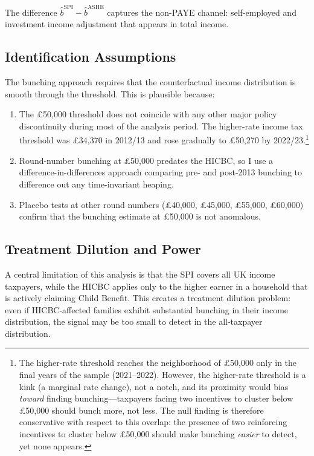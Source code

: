 \documentclass[12pt]{article}
\newcommand{\bhat}{\hat{b}}
\begin{document}
The difference $\bhat^{\text{SPI}} - \bhat^{\text{ASHE}}$ captures the non-PAYE channel: self-employed and investment income adjustment that appears in total income.

\subsection{Identification Assumptions}

The bunching approach requires that the counterfactual income distribution is smooth through the threshold. This is plausible because:

\begin{enumerate}
    \item The \pounds50,000 threshold does not coincide with any other major policy discontinuity during most of the analysis period. The higher-rate income tax threshold was \pounds34,370 in 2012/13 and rose gradually to \pounds50,270 by 2022/23.\footnote{The higher-rate threshold reaches the neighborhood of \pounds50,000 only in the final years of the sample (2021--2022). However, the higher-rate threshold is a kink (a marginal rate change), not a notch, and its proximity would bias \emph{toward} finding bunching---taxpayers facing two incentives to cluster below \pounds50,000 should bunch more, not less. The null finding is therefore conservative with respect to this overlap: the presence of two reinforcing incentives to cluster below \pounds50,000 should make bunching \emph{easier} to detect, yet none appears.}
    \item Round-number bunching at \pounds50,000 predates the HICBC, so I use a difference-in-differences approach comparing pre- and post-2013 bunching to difference out any time-invariant heaping.
    \item Placebo tests at other round numbers (\pounds40,000, \pounds45,000, \pounds55,000, \pounds60,000) confirm that the bunching estimate at \pounds50,000 is not anomalous.
\end{enumerate}

\subsection{Treatment Dilution and Power}

A central limitation of this analysis is that the SPI covers all UK income taxpayers, while the HICBC applies only to the higher earner in a household that is actively claiming Child Benefit. This creates a treatment dilution problem: even if HICBC-affected families exhibit substantial bunching in their income distribution, the signal may be too small to detect in the all-taxpayer distribution.
\end{document}
